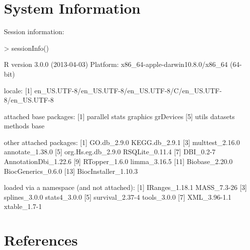 \documentclass[11pt]{article}
\renewenvironment{Schunk}{\vspace{\topsep}}{\vspace{\topsep}}
\begin{document}
\section{System Information}
Session information:

\begin{Schunk}
\begin{Sinput}
> sessionInfo()
\end{Sinput}
\begin{Soutput}
R version 3.0.0 (2013-04-03)
Platform: x86_64-apple-darwin10.8.0/x86_64 (64-bit)

locale:
[1] en_US.UTF-8/en_US.UTF-8/en_US.UTF-8/C/en_US.UTF-8/en_US.UTF-8

attached base packages:
[1] parallel  stats     graphics  grDevices
[5] utils     datasets  methods   base     

other attached packages:
 [1] GO.db_2.9.0          KEGG.db_2.9.1       
 [3] multtest_2.16.0      annotate_1.38.0     
 [5] org.Hs.eg.db_2.9.0   RSQLite_0.11.4      
 [7] DBI_0.2-7            AnnotationDbi_1.22.6
 [9] RTopper_1.6.0        limma_3.16.5        
[11] Biobase_2.20.0       BiocGenerics_0.6.0  
[13] BiocInstaller_1.10.3

loaded via a namespace (and not attached):
[1] IRanges_1.18.1  MASS_7.3-26    
[3] splines_3.0.0   stats4_3.0.0   
[5] survival_2.37-4 tools_3.0.0    
[7] XML_3.96-1.1    xtable_1.7-1   
\end{Soutput}
\end{Schunk}

\pagebreak
\section{References}
   
   
\end{document}
